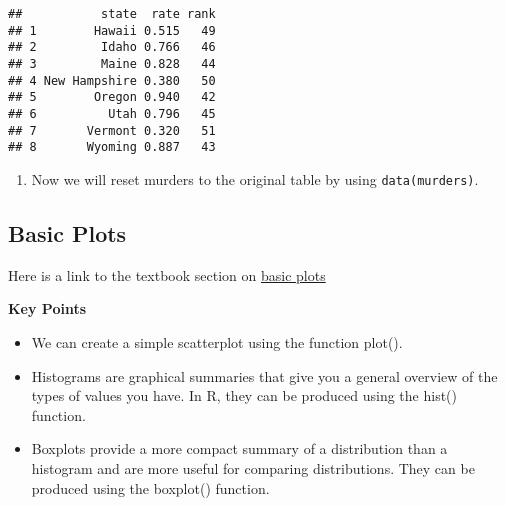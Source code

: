\documentclass[]{article}
\newenvironment{Shaded}{\begin{snugshade}}{\end{snugshade}}
\newcommand{\CommentTok}[1]{\textcolor[rgb]{0.56,0.35,0.01}{\textit{#1}}}
\newcommand{\DataTypeTok}[1]{\textcolor[rgb]{0.13,0.29,0.53}{#1}}
\newcommand{\DecValTok}[1]{\textcolor[rgb]{0.00,0.00,0.81}{#1}}
\newcommand{\KeywordTok}[1]{\textcolor[rgb]{0.13,0.29,0.53}{\textbf{#1}}}
\newcommand{\NormalTok}[1]{#1}
\newcommand{\OperatorTok}[1]{\textcolor[rgb]{0.81,0.36,0.00}{\textbf{#1}}}
\newcommand{\StringTok}[1]{\textcolor[rgb]{0.31,0.60,0.02}{#1}}
\providecommand{\tightlist}{%
  \setlength{\itemsep}{0pt}\setlength{\parskip}{0pt}}
\begin{document}
\begin{verbatim}
##           state  rate rank
## 1        Hawaii 0.515   49
## 2         Idaho 0.766   46
## 3         Maine 0.828   44
## 4 New Hampshire 0.380   50
## 5        Oregon 0.940   42
## 6          Utah 0.796   45
## 7       Vermont 0.320   51
## 8       Wyoming 0.887   43
\end{verbatim}

\begin{enumerate}
\def\labelenumi{\arabic{enumi}.}
\setcounter{enumi}{8}
\tightlist
\item
  Now we will reset murders to the original table by using
  \texttt{data(murders)}.
\end{enumerate}

\begin{Shaded}
\end{Shaded}

\hypertarget{basic-plots}{%
\subsection{Basic Plots}\label{basic-plots}}

Here is a link to the textbook section on
\href{https://rafalab.github.io/dsbook/r-basics.html\#basic-plots}{basic
plots}

\textbf{Key Points}

\begin{itemize}
\tightlist
\item
  We can create a simple scatterplot using the function plot().
\item
  Histograms are graphical summaries that give you a general overview of
  the types of values you have. In R, they can be produced using the
  hist() function.
\item
  Boxplots provide a more compact summary of a distribution than a
  histogram and are more useful for comparing distributions. They can be
  produced using the boxplot() function.
\end{itemize}
\end{document}
